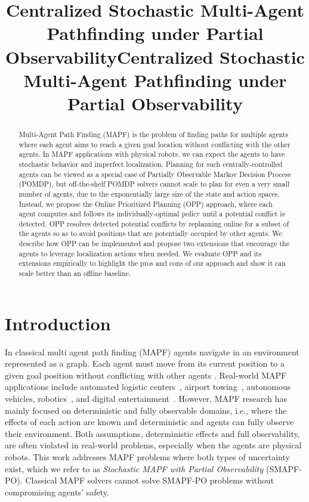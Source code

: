 \documentclass[letterpaper]{article} %
\title{Centralized Stochastic Multi-Agent Pathfinding under Partial Observability}
\begin{document}
\maketitle

\title{Centralized Stochastic Multi-Agent Pathfinding under Partial Observability}



\begin{abstract}
Multi-Agent Path Finding (MAPF) is the problem of finding paths for multiple agents where each agent aims to reach a given goal location without conflicting with the other agents.
In MAPF applications with physical robots, we can expect the agents to have stochastic behavior and imperfect localization.
Planning for such centrally-controlled agents can be viewed as a special case of Partially Observable Markov Decision Process (POMDP), but off-the-shelf POMDP solvers cannot scale to plan for even a very small number of agents, due to the exponentially large size of the state and action spaces.
Instead, we propose the Online Prioritized Planning (OPP) approach, where each agent computes and follows its individually-optimal policy until a potential conflict is detected.
OPP resolves detected potential conflicts by replanning online for a subset of the agents so as to avoid positions that are potentially occupied by other agents.
We describe how OPP can be implemented and propose two extensions that encourage the agents to leverage localization actions when needed.
We evaluate OPP and its extensions empirically to highlight the pros and cons of our approach and show it can scale better than an offline baseline.
\end{abstract}




\section{Introduction}

In classical multi agent path finding (MAPF) agents navigate in an environment represented as a graph.  Each agent must move from its current position to a given goal position without conflicting with other agents \cite{stern2019mapf}.
Real-world MAPF applications include automated logistic centers~\cite{wurman2008coordinating,salzman2020research}, airport towing~\cite{morris2016planning}, autonomous vehicles, robotics~\cite{veloso2015cobots}, and digital entertainment~\cite{ma2017feasibility}. However, MAPF research has mainly focused on deterministic and fully observable domains, i.e., where the effects of each action are known and deterministic and agents can fully observe their environment.
Both assumptions, deterministic effects and full observability, are often violated in real-world problems, especially when the agents are physical robots.
This work addresses MAPF problems where both types of uncertainty exist, which we refer to as \emph{Stochastic MAPF with Partial Observability} (SMAPF-PO).
Classical MAPF solvers cannot solve SMAPF-PO problems without compromising agents' safety.
\end{document}
